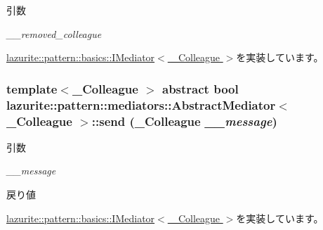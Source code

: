 \begin{DoxyParams}{引数}
\item[{\em \_\-\_\-removed\_\-colleague}]\end{DoxyParams}


\hyperlink{interfacelazurite_1_1pattern_1_1basics_1_1_i_mediator_3_01___colleague_01_4_a9ddd29033f71ca3f8b5e15a1ac9de5ff}{lazurite::pattern::basics::IMediator$<$ \_\-Colleague $>$}を実装しています。\hypertarget{classlazurite_1_1pattern_1_1mediators_1_1_abstract_mediator_3_01___colleague_01_4_a1b702e3797af6ce233dd4ac910d63282}{
\subsubsection[{send}]{\setlength{\rightskip}{0pt plus 5cm}template$<$\_\-Colleague $>$ abstract bool lazurite::pattern::mediators::AbstractMediator$<$ \_\-Colleague $>$::send (\_\-Colleague {\em \_\-\_\-message})}}
\label{classlazurite_1_1pattern_1_1mediators_1_1_abstract_mediator_3_01___colleague_01_4_a1b702e3797af6ce233dd4ac910d63282}

\begin{DoxyParams}{引数}
\item[{\em \_\-\_\-message}]\end{DoxyParams}
\begin{DoxyReturn}{戻り値}

\end{DoxyReturn}


\hyperlink{interfacelazurite_1_1pattern_1_1basics_1_1_i_mediator_3_01___colleague_01_4_a60b933645ef7e6f3fd5c9de47bda90df}{lazurite::pattern::basics::IMediator$<$ \_\-Colleague $>$}を実装しています。

